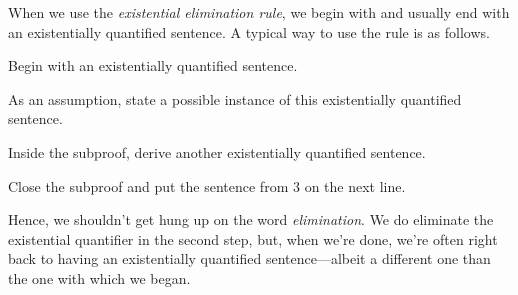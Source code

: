 \begin{notebox}
When we use the \textit{existential elimination rule}, we begin with and usually end with an existentially quantified sentence. A typical way to use the rule is as follows. 
\begin{ebullet}
\item[(1)] Begin with an existentially quantified sentence. 
\item[(2)] As an assumption, state a possible instance of this existentially quantified sentence. 
\item[(3)] Inside the subproof, derive another existentially quantified sentence.
\item[(4)] Close the subproof and put the sentence from 3 on the next line. 
\end{ebullet}
Hence, we shouldn't get hung up on the word \textit{elimination}. We do eliminate the existential quantifier in the second step, but, when we're done, we're often right back to having an existentially quantified sentence---albeit a different one than the one with which we began.
\end{notebox}

